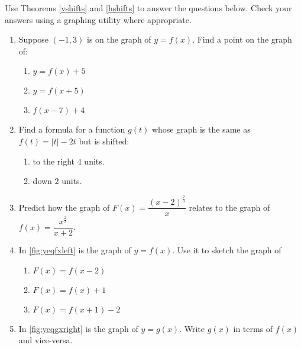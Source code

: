  \begin{ex} \label{shiftex}  Use Theorems  \ref{vshifts} and \ref{hshifts} to answer the questions below.  Check your answers using a graphing utility where appropriate.
 
 \begin{enumerate}
 
 \item  Suppose $(-1,3)$ is on the graph of $y = f(x)$.  Find a point on the graph of:
 
 \begin{enumerate}
 \item $y = f(x)+5$
 \item $y = f(x+5)$
 \item  $f(x-7)+4$
 \end{enumerate}
 
 \item  Find a formula for a function $g(t)$ whose graph is the same as $f(t) = |t|-2t$ but is shifted:
 
 \begin{multicols}{2}
 
 \begin{enumerate}
 
 \item to the right $4$ units.
 
 \item down $2$ units.
 
 \end{enumerate}
 
 \end{multicols}
 
 \item Predict how the graph of $F(x) = \dfrac{(x-2)^{\frac{2}{3}}}{x}$ relates to the graph of $f(x) = \dfrac{x^{\frac{2}{3}}}{x+2}$. 
 
\item  In \autoref{fig:yeqfxleft} is the graph of $y = f(x)$.  Use it to sketch the graph of

\begin{enumerate}
\item $F(x) = f(x-2)$
\item $F(x)= f(x)+1$
\item $F(x)= f(x+1)-2$
\end{enumerate}
 
\item  In \autoref{fig:yeqgxright} is the graph of $y = g(x)$.  Write $g(x)$ in terms of $f(x)$ and vice-versa.
 
\begin{mfigure}


\end{mfigure}
\end{enumerate}
\end{ex}
